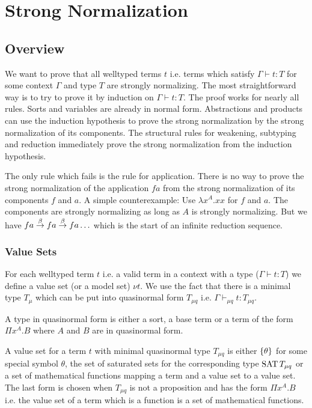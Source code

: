 \section{Strong Normalization}


\subsection{Overview}

We want to prove that all welltyped terms $t$ i.e. terms which satisfy $\Gamma
\vdash t: T$ for some context $\Gamma$ and type $T$ are strongly normalizing.
The most straightforward way is to try to prove it by induction on $\Gamma
\vdash t: T$. The proof works for nearly all rules. Sorts and variables are
already in normal form. Abstractions and products can use the induction
hypothesis to prove the strong normalization by the strong normalization of its
components. The structural rules for weakening, subtyping and reduction
immediately prove the strong normalization from the induction hypothesis.

The only rule which fails is the rule for application. There is no way to prove
the strong normalization of the application $f a$ from the strong normalization
of its components $f$ and $a$. A simple counterexample: Use $\lambda x^A. x x$
for $f$ and $a$. The components are strongly normalizing as long as $A$ is
strongly normalizing. But we have $f a \stackrel{\beta}{\to} f a \stackrel{\beta}{\to} f a \ldots$ which is
the start of an infinite reduction sequence.



\subsubsection{Value Sets}

For each welltyped term $t$ i.e. a valid term in a context with a type ($\Gamma
\vdash t: T$) we define a value set (or a model set) $\nu t$. We use the fact
that there is a minimal type $T_\mu$ which can be put into quasinormal form
$T_{\mu q}$ i.e.  $\Gamma \vdash_{\mu q} t: T_{\mu q}$.

A type in quasinormal form is either a sort, a base term or a term of the form
$\Pi x^A. B$ where $A$ and $B$ are in quasinormal form.

A value set for a term $t$ with minimal quasinormal type $T_{\mu q}$ is either
${\left\{\theta\right\}}$ for some special symbol $\theta$, the set of saturated sets for
the corresponding type $\text{SAT}\, T_{\mu q}$ or a set of mathematical functions
mapping a term and a value set to a value set. The last form is chosen when
$T_{\mu q}$ is not a proposition and has the form $\Pi x^A. B$ i.e. the value
set of a term which is a function is a set of mathematical functions.

